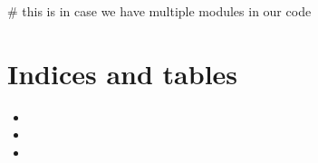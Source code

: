 \documentclass[letterpaper,10pt,english]{sphinxmanual}
\begin{document}
\sphinxAtStartPar
\# this is in case we have multiple modules in our code


\chapter{Indices and tables}
\label{\detokenize{index:indices-and-tables}}\begin{itemize}
\item {} 
\sphinxAtStartPar
{}

\item {} 
\sphinxAtStartPar
{}

\item {} 
\sphinxAtStartPar
{}

\end{itemize}
\end{document}
